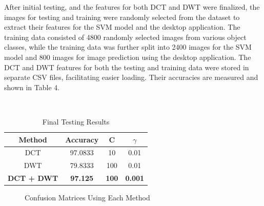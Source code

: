 \documentclass{icsthesis}
\begin{document}
\begin{mainmatter}
After initial testing, and the features for both DCT and DWT were finalized, the images for testing and training were randomly selected from the dataset to extract their features for the SVM model and the desktop application. The training data consisted of 4800 randomly selected images from various object classes, while the training data was further split into 2400 images for the SVM model and 800 images for image prediction using the desktop application. The DCT and DWT features for both the testing and training data were stored in separate CSV files, facilitating easier loading. Their accuracies are measured and shown in Table 4. 

\\
\begin{table}[H]
\centering
\begin{tabular}{|c|c|c|c|}
\hline
Method             & Accuracy        & C            & $\gamma$            \\ \hline
DCT                & 97.0833         & 10           & 0.01           \\ \hline
DWT                & 79.8333         & 100          & 0.01           \\ \hline
\textbf{DCT + DWT} & \textbf{97.125} & \textbf{100} & \textbf{0.001} \\ \hline
\end{tabular}
\caption{Final Testing Results}
\end{table}

\begin{figure}
    \centering
    \vspace{4ex}
    \hfil
    \hfil
    \caption{Confusion Matrices Using Each Method}
    \label{fig:mainfig}
\end{figure}


\end{mainmatter}
\end{document}
